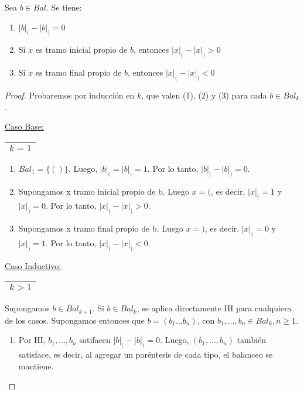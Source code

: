   \begin{lemma} \label{lemma_30}
    \PN Sea $b \in Bal$. Se tiene:
    \begin{enumerate}[(1)]
      \item $\lvert b \rvert_{(} - \lvert b \rvert_{)} = 0$
      \item Si $x$ es tramo inicial propio de $b$, entonces $\lvert x \rvert_{(} - \lvert x \rvert_{)} > 0$
      \item Si $x$ es tramo final propio de $b$, entonces $\lvert x \rvert_{(} - \lvert x \rvert_{)} < 0$
    \end{enumerate}
  \end{lemma}
  \begin{proof}
    \PN Probaremos por inducción en $k$, que valen (1), (2) y (3) para cada $b \in Bal_{k}$.

    \vspace{3mm}
    \PN \underline{Caso Base:} \begin{tabular}{|c|} \hline $k = 1$ \\\hline \end{tabular}
    \begin{enumerate}[(1)]
      \item $Bal_{1} = \{()\}$. Luego, $\lvert b \rvert_{(} = \lvert b \rvert_{)} = 1$. Por lo tanto, $\lvert b
       \rvert_{(} - \lvert b \rvert_{)} = 0$.
      \item Supongamos x tramo inicial propio de b. Luego $x = ($, es decir, $\lvert x \rvert_{(} = 1$ y $\lvert x
      \rvert_{)} = 0$. Por lo tanto, $\lvert x \rvert_{(} - \lvert x \rvert_{)} > 0$.
      \item Supongamos x tramo final propio de b. Luego $x = )$, es decir, $\lvert x \rvert_{(} = 0$ y $\lvert x
      \rvert_{)} = 1$. Por lo tanto, $\lvert x \rvert_{(} - \lvert x \rvert_{)} < 0$.
    \end{enumerate}

  	\PN \underline{Caso Inductivo:} \begin{tabular}{|c|} \hline $k > 1$ \\\hline \end{tabular} Supongamos $b \in
    Bal_{k+1}$. Si $b \in Bal_{k}$, se aplica directamente HI para cualquiera de los casos. Supongamos entonces que
    $b = (b_{1} \dotsc b_{n})$, con $b_{1}, \dotsc, b_{n} \in Bal_{k}, n \geq 1$.

    \begin{enumerate}[(1)]
      \item Por HI, $b_{1}, \dotsc, b_{n}$ satifacen $\lvert b \rvert_{(} - \lvert b \rvert_{)} = 0$. Luego, $(b_{1},
        \dotsc, b_{n})$ también satisface, es decir, al agregar un paréntesis de cada tipo, el balanceo se mantiene.


\end{enumerate}
\end{proof}
